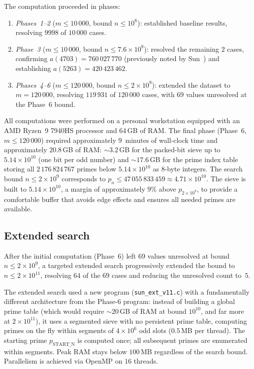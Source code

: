 \documentclass{amsart}
\theoremstyle{definition}
\theoremstyle{remark}
\numberwithin{equation}{section}
\begin{document}
The computation proceeded in phases:
\begin{enumerate}
	\item \emph{Phases~1--2} ($m \leq 10\,000$, bound $n \leq 10^8$):
	established baseline results, resolving $9998$ of $10\,000$ cases.
	\item \emph{Phase~3} ($m \leq 10\,000$,
	bound $n \leq 7.6 \times 10^8$):
	resolved the remaining $2$ cases, confirming
	$a(4703) = 760\,027\,770$ (previously noted by Sun~\cite{Sun2019})
	and establishing $a(5263) = 420\,423\,462$.
	\item \emph{Phases~4--6} ($m \leq 120\,000$,
	bound $n \leq 2 \times 10^9$):
	extended the dataset to $m = 120\,000$, resolving $119\,931$ of
	$120\,000$ cases, with $69$ values unresolved at the Phase~6 bound.
\end{enumerate}

All computations were performed on a personal workstation equipped with
an AMD Ryzen~9 7940HS processor and 64\,GB of RAM\@.
The final phase (Phase~6, $m \leq 120\,000$) required approximately
$9$~minutes of wall-clock time and approximately $20.8$\,GB of
RAM: $\sim 3.2$\,GB for the packed-bit sieve up to
$5.14 \times 10^{10}$ (one bit per odd number) and $\sim 17.6$\,GB for
the prime index table storing all $2\,176\,824\,767$ primes below
$5.14 \times 10^{10}$ as 8-byte integers.
The search bound $n \leq 2 \times 10^9$ corresponds to
$p_n \leq 47\,055\,833\,459 \approx 4.71 \times 10^{10}$.
The sieve is built to $5.14 \times 10^{10}$, a margin of
approximately $9\%$ above $p_{2 \times 10^9}$, to provide a
comfortable buffer that avoids edge effects and ensures all needed
primes are available.

\subsection{Extended search}
\label{sec:extended}

After the initial computation (Phase~6) left $69$ values unresolved
at bound $n \leq 2 \times 10^9$, a targeted extended search
progressively extended the bound to $n \leq 2 \times 10^{11}$,
resolving $64$ of the $69$ cases and reducing the unresolved count
to~$5$.

The extended search used a new program (\texttt{sun\_ext\_v11.c})
with a fundamentally different architecture from the Phase-6 program:
instead of building a global prime table (which would require
$\sim 20$\,GB of RAM at bound $10^{10}$, and far more at
$2 \times 10^{11}$), it uses a segmented sieve with no persistent
prime table, computing primes on the fly within segments of
$4 \times 10^6$ odd slots ($0.5$\,MB per thread).
The starting prime $p_{\mathrm{START\_N}}$ is computed once; all
subsequent primes are enumerated within segments.
Peak RAM stays below $100$\,MB regardless of the search bound.
Parallelism is achieved via OpenMP on $16$ threads.
\end{document}
